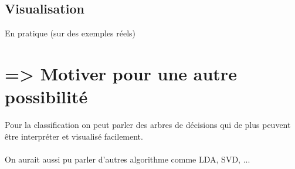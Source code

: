         \newpage



        \subsection{Visualisation}
        En pratique (sur des exemples réels)
    


    \section{ => Motiver pour une autre possibilité}
    Pour la classification on peut parler des arbres de décisions qui de plus peuvent être interpréter et visualisé facilement.
    \\
    \\
    On aurait aussi pu parler d'autres algorithme comme LDA, SVD, ... 
